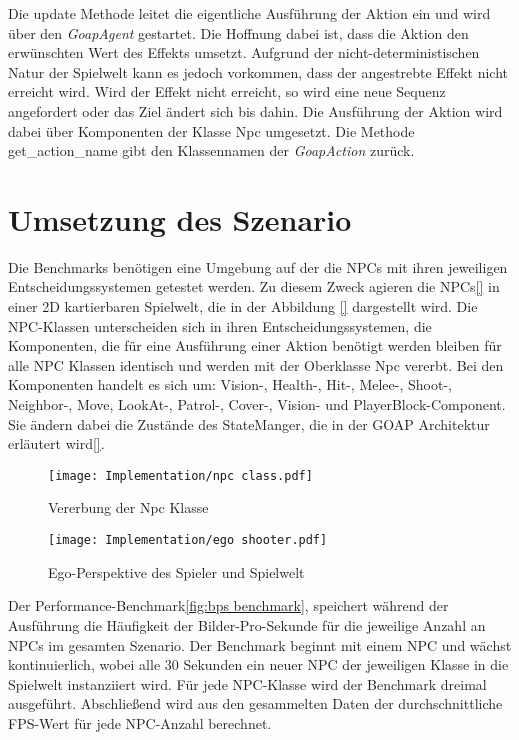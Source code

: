 Die update Methode leitet die eigentliche Ausführung der Aktion ein und wird über den \textit{GoapAgent} gestartet. Die Hoffnung dabei ist, dass die Aktion den erwünschten Wert des Effekts umsetzt. Aufgrund der nicht-deterministischen Natur der Spielwelt kann es jedoch vorkommen, dass der angestrebte Effekt nicht erreicht wird. Wird der Effekt nicht erreicht, so wird eine neue Sequenz angefordert oder das Ziel ändert sich bis dahin. Die Ausführung der Aktion wird dabei über Komponenten der Klasse Npc umgesetzt. Die Methode get\_action\_name gibt den Klassennamen der \textit{GoapAction} zurück.


\section{Umsetzung des Szenario}
\label{chap:implementierung szenario}

Die Benchmarks benötigen eine Umgebung auf der die NPCs mit ihren jeweiligen Entscheidungssystemen getestet werden. Zu diesem Zweck agieren die NPCs\ref{} in einer 2D kartierbaren Spielwelt, die in der Abbildung \ref{} dargestellt wird. Die NPC-Klassen unterscheiden sich in ihren Entscheidungssystemen, die Komponenten, die für eine Ausführung einer Aktion benötigt werden bleiben für alle NPC Klassen identisch und werden mit der Oberklasse Npc vererbt. Bei den Komponenten handelt es sich um: Vision-, Health-, Hit-, Melee-, Shoot-, Neighbor-, Move, LookAt-, Patrol-, Cover-, Vision- und PlayerBlock-Component. Sie ändern dabei die Zustände des StateManger, die in der GOAP Architektur erläutert wird\ref{}.

\begin{figure}[h]
  \centering
  \texttt{[image: Implementation/npc class.pdf]}
	\captionsetup{justification=justified, format=plain}
  \caption{Vererbung der Npc Klasse}
  \label{fig:npc class}
\end{figure}

\begin{figure}[h]
  \centering
  \texttt{[image: Implementation/ego shooter.pdf]}
	\captionsetup{justification=justified, format=plain}
  \caption{Ego-Perspektive des Spieler und Spielwelt}
  \label{fig:ego shooter}
\end{figure}

Der Performance-Benchmark\ref{fig:bps benchmark}, speichert während der Ausführung die Häufigkeit der Bilder-Pro-Sekunde für die jeweilige Anzahl an NPCs im gesamten Szenario. Der Benchmark beginnt mit einem NPC und wächst kontinuierlich, wobei alle 30 Sekunden ein neuer NPC der jeweiligen Klasse in die Spielwelt instanziiert wird. Für jede NPC-Klasse wird der Benchmark dreimal ausgeführt. Abschlie\ss{}end wird aus den gesammelten Daten der durchschnittliche FPS-Wert für jede NPC-Anzahl berechnet.

